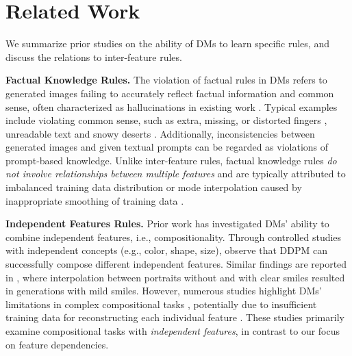 \section{Related Work}
\label{sec:related}

We summarize prior studies on the ability of DMs to learn specific rules, and discuss the relations to inter-feature rules.


\textbf{Factual Knowledge Rules.} The violation of factual rules in DMs refers to generated images failing to accurately reflect factual information and common sense, often characterized as hallucinations in existing work \cite{aithal2024understanding,lim2024addressing,anonymous2025towards}. Typical examples include violating common sense, such as extra, missing, or distorted fingers \cite{aithal2024understanding,pelykh2024giving,ye2023diffusion}, unreadable text \cite{gong2022diffuseq,tang2023can,xu2024energy} and snowy deserts \cite{lim2024addressing}. Additionally, inconsistencies between generated images and given textual prompts \cite{liu2023discovering,fu2024enhancing,mahajan2024prompting,li2024sd4match} can be regarded as violations of prompt-based knowledge. Unlike inter-feature rules, factual knowledge rules \textit{do not involve relationships between multiple features} and are typically attributed to imbalanced training data distribution \cite{samuel2024generating} or mode interpolation caused by inappropriate smoothing of training data \cite{aithal2024understanding}.

\textbf{Independent Features Rules.}  Prior work has investigated DMs' ability to combine independent features, i.e., compositionality. Through controlled studies with independent concepts (e.g., color, shape, size), \citet{okawa2024compositional} observe that DDPM can successfully compose different independent features. Similar findings are reported in \cite{deschenauxgoing}, where interpolation between portraits without and with clear smiles resulted in generations with mild smiles. However, numerous studies highlight DMs' limitations in complex compositional tasks \cite{liu2022compositional,gokhale2022benchmarking,feng2022training,marioriyad2024diffusion}, potentially due to insufficient training data for reconstructing each individual feature \cite{wiedemer2024compositional}. These studies primarily examine compositional tasks with \textit{independent features}, in contrast to our focus on feature dependencies.

